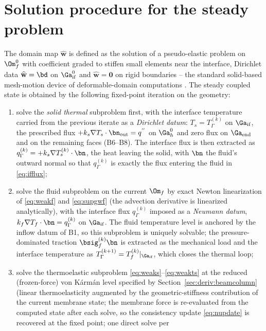 \section{Solution procedure for the steady problem}
\label{sec:iteration}
The domain map $\widehat{\mathbf w}$ is defined as the solution of a pseudo-elastic problem on
$\Om_f^0$ with coefficient graded to stiffen small elements near the interface, Dirichlet data
$\widehat{\mathbf w}=\bd$ on $\Ga_{\mathrm{if}}^0$ and $\widehat{\mathbf w}=\mathbf 0$ on rigid
boundaries -- the standard solid-based mesh-motion device of deformable-domain computations
\cite{lesoinne1996geometric}. The steady coupled state is obtained by the following fixed-point
iteration on the geometry:
\begin{enumerate}\itemsep1pt
\item solve the \emph{solid thermal} subproblem first, with the interface temperature carried from
the previous iterate as a \emph{Dirichlet datum}: $T_s=T_\Gamma^{(k)}$ on $\Ga_{\mathrm{if}}$, the
prescribed flux $+k_s\nabla T_s\cdot\bn_{\mathrm{out}}=q^{''}$ on $\Ga_h^0$ and zero flux on
$\Ga_{\mathrm{end}}$ and on the remaining faces (B6--B8). The interface flux is then extracted as
$q_\Gamma^{(k)}=+k_s\nabla T_s^{(k)}\cdot\bn$, the heat leaving the solid, with $\bn$ the fluid's
outward normal so that $q_\Gamma^{(k)}$ is exactly the flux entering the fluid in
\eqref{eq:ifflux};
\item solve the fluid subproblem on the current $\Om_f$ by exact Newton linearization of
\eqref{eq:weakf} and \eqref{eq:supgwf} (the advection derivative is linearized analytically), with
the interface flux $q_\Gamma^{(k)}$ imposed as a \emph{Neumann datum},
$k_f\nabla T_f\cdot\bn=q_\Gamma^{(k)}$ on $\Ga_{\mathrm{if}}$. The fluid temperature level is
anchored by the inflow datum of B1, so this subproblem is uniquely solvable; the pressure-dominated
traction $\bsig_f^{(k)}\bn$ is extracted as the mechanical load and the interface temperature as
$T_\Gamma^{(k+1)}=T_f^{(k)}|_{\Ga_{\mathrm{if}}}$, which closes the thermal loop;
\item solve the thermoelastic subproblem \eqref{eq:weaks}--\eqref{eq:weakts} at the reduced
(frozen-force) von K\'arm\'an level specified by Section~\ref{sec:deriv:beamcolumn} (linear
thermoelasticity augmented by the geometric-stiffness contribution of the current membrane
state; the membrane force is re-evaluated from the computed state after each solve, so the
consistency update \eqref{eq:nupdate} is recovered at the fixed point; one direct solve per

\end{enumerate}
